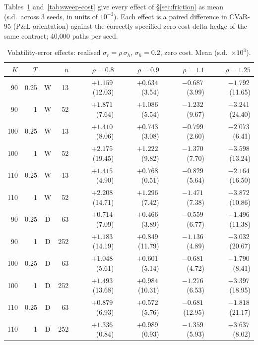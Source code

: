 \documentclass{article}
\newcommand{\cvar}{CVaR-95}
\begin{document}
Tables~\ref{tab:sweep-vol} and~\ref{tab:sweep-cost} give every effect of \S\ref{sec:friction}
as mean (s.d.\ across 3 seeds, in units of $10^{-3}$). Each effect is a paired difference in
\cvar{} (P\&L orientation) against the correctly specified zero-cost delta hedge of the same
contract; 40{,}000 paths per seed.

\begin{table}[h]
  \caption{Volatility-error effects: realised $\sigma_r = \rho\,\sigma_h$, $\sigma_h = 0.2$,
    zero cost. Mean (s.d.\ $\times 10^{3}$).}
  \label{tab:sweep-vol}
  \centering
  \footnotesize
  \begin{tabular}{rrcr rrrr}
    \toprule
    $K$ & $T$ & & $n$ & $\rho = 0.8$ & $\rho = 0.9$ & $\rho = 1.1$ & $\rho = 1.25$ \\
    \midrule
    90 & 0.25 & W & 13 & $+1.159$\,(12.03) & $+0.634$\,(3.54) & $-0.687$\,(3.99) & $-1.792$\,(11.65) \\
    90 & 1 & W & 52 & $+1.871$\,(7.64) & $+1.086$\,(5.54) & $-1.232$\,(9.67) & $-3.241$\,(24.40) \\
    100 & 0.25 & W & 13 & $+1.410$\,(8.06) & $+0.743$\,(3.08) & $-0.799$\,(2.60) & $-2.073$\,(6.41) \\
    100 & 1 & W & 52 & $+2.175$\,(19.45) & $+1.222$\,(9.82) & $-1.370$\,(7.70) & $-3.598$\,(13.24) \\
    110 & 0.25 & W & 13 & $+1.415$\,(4.90) & $+0.768$\,(0.51) & $-0.829$\,(5.64) & $-2.164$\,(16.50) \\
    110 & 1 & W & 52 & $+2.208$\,(14.71) & $+1.296$\,(7.42) & $-1.471$\,(7.38) & $-3.872$\,(10.86) \\
    \midrule
    90 & 0.25 & D & 63 & $+0.714$\,(7.09) & $+0.466$\,(3.89) & $-0.559$\,(6.77) & $-1.496$\,(11.38) \\
    90 & 1 & D & 252 & $+1.183$\,(14.19) & $+0.849$\,(11.79) & $-1.136$\,(4.89) & $-3.032$\,(20.67) \\
    100 & 0.25 & D & 63 & $+1.048$\,(5.61) & $+0.601$\,(5.14) & $-0.681$\,(4.72) & $-1.790$\,(8.41) \\
    100 & 1 & D & 252 & $+1.493$\,(13.68) & $+0.984$\,(10.31) & $-1.276$\,(6.53) & $-3.397$\,(18.95) \\
    110 & 0.25 & D & 63 & $+0.879$\,(6.93) & $+0.572$\,(5.76) & $-0.681$\,(12.95) & $-1.818$\,(21.17) \\
    110 & 1 & D & 252 & $+1.336$\,(0.84) & $+0.989$\,(0.93) & $-1.359$\,(5.93) & $-3.637$\,(8.02) \\
    \bottomrule
  \end{tabular}
\end{table}
\end{document}
